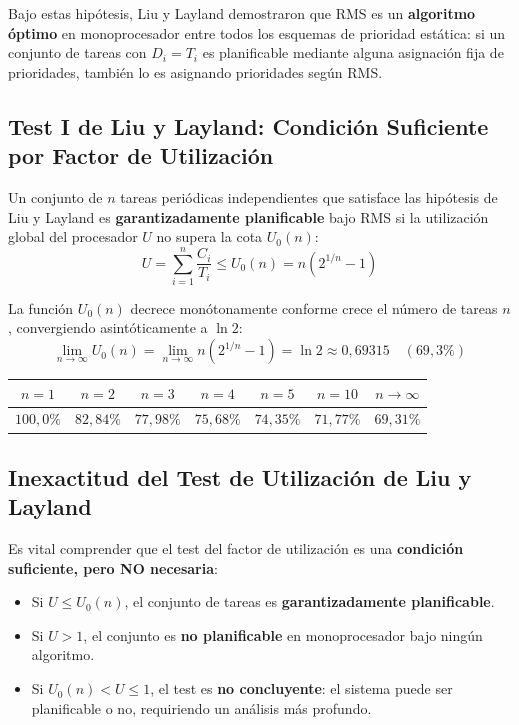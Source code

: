 Bajo estas hipótesis, Liu y Layland demostraron que RMS es un \textbf{algoritmo óptimo} en monoprocesador entre todos los esquemas de prioridad estática: si un conjunto de tareas con $D_i = T_i$ es planificable mediante alguna asignación fija de prioridades, también lo es asignando prioridades según RMS.

\subsection{Test I de Liu y Layland: Condición Suficiente por Factor de Utilización}
\begin{definicion}
Un conjunto de $n$ tareas periódicas independientes que satisface las hipótesis de Liu y Layland es \textbf{garantizadamente planificable} bajo RMS si la utilización global del procesador $U$ no supera la cota $U_0(n)$:
\begin{equation}
U = \sum_{i=1}^n \frac{C_i}{T_i} \le U_0(n) = n \left( 2^{1/n} - 1 \right)
\end{equation}
\end{definicion}

La función $U_0(n)$ decrece monótonamente conforme crece el número de tareas $n$, convergiendo asintóticamente a $\ln 2$:
\begin{equation}
\lim_{n \to \infty} U_0(n) = \lim_{n \to \infty} n \left( 2^{1/n} - 1 \right) = \ln 2 \approx 0{,}69315 \quad (69{,}3\%)
\end{equation}

\begin{center}
\begin{tabular}{ccccccc}
\toprule
$n = 1$ & $n = 2$ & $n = 3$ & $n = 4$ & $n = 5$ & $n = 10$ & $n \to \infty$ \\
\midrule
$100{,}0\%$ & $82{,}84\%$ & $77{,}98\%$ & $75{,}68\%$ & $74{,}35\%$ & $71{,}77\%$ & $69{,}31\%$ \\
\bottomrule
\end{tabular}
\end{center}

\subsection{Inexactitud del Test de Utilización de Liu y Layland}
Es vital comprender que el test del factor de utilización es una \textbf{condición suficiente, pero NO necesaria}:
\begin{itemize}[leftmargin=*]
    \item Si $U \le U_0(n)$, el conjunto de tareas es \textbf{garantizadamente planificable}.
    \item Si $U > 1$, el conjunto es \textbf{no planificable} en monoprocesador bajo ningún algoritmo.
    \item Si $U_0(n) < U \le 1$, el test es \textbf{no concluyente}: el sistema puede ser planificable o no, requiriendo un análisis más profundo.
\end{itemize}


